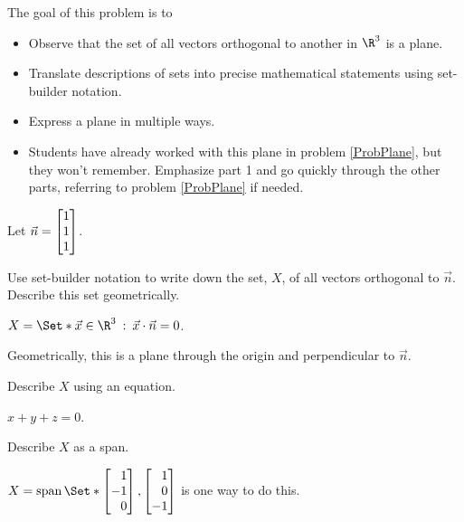 \documentclass{problemset}
\newcommand{\bookonlynewpage}{\begin{bookonly}\newpage\end{bookonly}}
\begin{document}
	\bookonlynewpage
	\question
	\begin{annotation}
		\begin{goals}

			The goal of this problem is to
			\begin{itemize}
				\item Observe that the set of all vectors orthogonal to another in $\R^3$
					is a plane.
				\item Translate descriptions of sets into precise mathematical statements using
					set-builder notation.
				\item Express a plane in multiple ways.
			\end{itemize}
		\end{goals}

		\begin{notes}
			\begin{itemize}
				\item Students have already worked with this plane in problem \ref{ProbPlane},
					but they won't remember. Emphasize part 1 and go quickly through the other parts,
					referring to problem \ref{ProbPlane} if needed.
			\end{itemize}
		\end{notes}
	\end{annotation}
	Let $\vec n=\mat{1\\1\\1}$.
	\begin{parts}
		\item Use set-builder notation to write down the set, $X$, of
			all vectors orthogonal to $\vec n$. Describe this set
			geometrically.
			\begin{solution}
				$X = \Set*{\vec x\in \R^3 \given \vec x\cdot \vec n = 0}$.

				Geometrically, this is a plane through the origin and
				perpendicular to $\vec n$.
			\end{solution}
		\item Describe $X$ using an equation.
			\begin{solution}[inline]
				$x+y+z=0$.
			\end{solution}
		\item Describe $X$ as a span.
			\begin{solution}[inline]
				$X = \Span\Set*{\mat{1\\-1\\0},\mat{1\\0\\-1}}$ is one way to do this.
			\end{solution}
	\end{parts}
\end{document}
